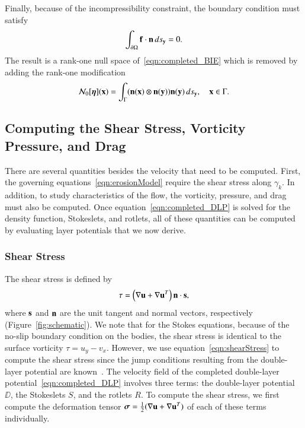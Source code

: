 \documentclass[preprint, 10pt]{elsarticle}
\begin{document}
Finally, because of the incompressibility constraint, the boundary
condition must satisfy 
\begin{align*}
  \int_{\bd\Omega} \ff \cdot \nn \, ds_\yy = 0.
\end{align*}
The result is a rank-one null space of~\eqref{eqn:completed_BIE} which
is removed by adding the rank-one modification 
\begin{align}
  \NN_0[\eeta](\xx) = \int_{\Gamma} 
    (\nn(\xx) \otimes \nn(\yy))\nn(\yy) \, ds_\yy, \quad \xx \in \Gamma.
\end{align}



\subsection{Computing the Shear Stress, Vorticity Pressure, and Drag} 
\label{sec:qois}
There are several quantities besides the velocity that need to be
computed.  First, the governing equations~\eqref{eqn:erosionModel}
require the shear stress along $\gamma_k$.  In addition, to study
characteristics of the flow, the vorticity, pressure, and drag must also
be computed.  Once equation~\eqref{eqn:completed_DLP} is solved for the
density function, Stokeslets, and rotlets, all of these quantities can
be computed by evaluating layer potentials that we now derive.

\subsubsection{Shear Stress}
The shear stress is defined by
\begin{align}
  \tau = \left(\nabla \uu + \nabla \uu^T \right)\nn \cdot \ss,
  \label{eqn:shearStress}
\end{align}
where $\ss$ and $\nn$ are the unit tangent and normal vectors,
respectively (Figure~\ref{fig:schematic}).  We note that for the Stokes
equations, because of the no-slip boundary condition on the bodies, the
shear stress is identical to the surface vorticity $\tau = u_y - v_x$.
However, we use equation~\eqref{eqn:shearStress} to compute the shear
stress since the jump conditions resulting from the double-layer
potential are known~\cite{qua-bir2014a}.  The velocity field of the
completed double-layer potential~\eqref{eqn:completed_DLP} involves
three terms: the double-layer potential $\DD$, the Stokeslets $S$, and
the rotlets $R$.  To compute the shear stress, we first compute the
deformation tensor $\ssigma = \frac{1}{2}(\nabla\uu + \nabla\uu^T)$ of
each of these terms individually.
\end{document}
